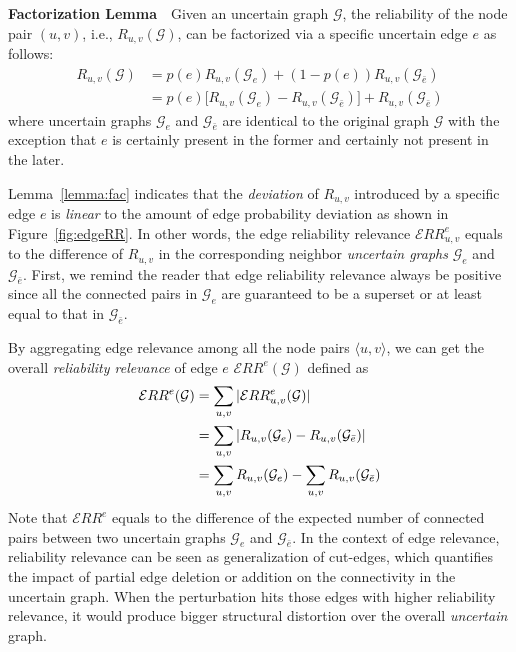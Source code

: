 \begin{lemma}
    \textbf{Factorization Lemma}~~Given an uncertain graph $\mathcal{G}$, the reliability of the node pair $(u,v)$, i.e., $R_{u,v}(\mathcal{G})$, can be factorized via a specific uncertain edge $e$ as follows:
    \begin{align*}
      R_{u,v}(\mathcal{G}) &= p(e) R_{u,v} (\mathcal{G}_{e}) + (1-p(e)) R_{u,v} (\mathcal{G}_{\bar{e}}) \\
                          & = p(e) \big[ R_{u,v} (\mathcal{G}_{e}) - R_{u,v} (\mathcal{G}_{\bar{e}}) \big] + R_{u,v} (\mathcal{G}_{\bar{e}})
    \end{align*}
    where uncertain graphs $\mathcal{G}_{e}$ and  $\mathcal{G}_{\bar{e}}$ are identical to the original graph $\mathcal{G}$ with the 
    exception that $e$ is certainly present in the former and certainly not present in the later.
    \label{lemma:fac} 
\end{lemma}

Lemma~\ref{lemma:fac} indicates that the \emph{deviation} of $R_{u,v}$ introduced by a specific edge $e$ is \emph{linear} to the amount of edge probability deviation as shown in Figure~\ref{fig:edgeRR}. In other words, the edge reliability relevance $\mathcal{E}RR^{e}_{u,v}$ equals to the difference of $R_{u,v}$ in the corresponding neighbor \emph{uncertain graphs} $\mathcal{G}_{e}$ and $\mathcal{G}_{\bar{e}}$. First, we remind the reader that edge reliability relevance always be positive since all the connected pairs in $\mathcal{G}_{e}$ are guaranteed to be a superset or at least equal to that in $\mathcal{G}_{\bar{e}}$.


By aggregating edge relevance among all the node pairs $\langle u,v \rangle$, we can get the overall {\em reliability relevance} of edge $e$ $\mathcal{E}RR^{e}(\mathcal{G})$ defined as 
\begin{align*}
    \vspace{-1em}
    \mathcal{E}RR^e(\mathcal{G}) &= \sum_{u,v} |\mathcal{E}RR^e_{u,v}(\mathcal{G})| \\
                                 &= \sum_{u,v} |R_{u,v}(\mathcal{G}_{e}) -R_{u,v}(\mathcal{G}_{\bar{e}})| \\  
                                 &= \sum_{u,v} R_{u,v} (\mathcal{G}_{e}) - \sum_{u,v} R_{u,v}(\mathcal{G}_{\bar{e}}) 
\end{align*}
Note that $\mathcal{E}RR^e$ equals to the difference of the expected number of connected pairs between two uncertain graphs $\mathcal{G}_{e}$ and $\mathcal{G}_{\bar{e}}$.  
In the context of edge relevance, reliability relevance can be seen as generalization of cut-edges, which quantifies the impact of partial edge deletion or addition on the connectivity in the uncertain graph. 
When the perturbation hits those edges with higher reliability relevance, it would produce bigger structural distortion over the overall \emph{uncertain} graph. 


